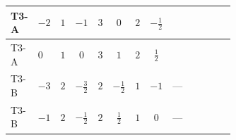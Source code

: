 \documentclass[8pt]{article}
\begin{document}
\begin{landscape}
\begin{longtable}{@{}llcccccc >{\raggedright\arraybackslash}p{0.21\linewidth} >{\raggedright\arraybackslash}p{0.21\linewidth} >{\raggedright\arraybackslash}p{0.21\linewidth}@{}}
T3-A & $-2$ & $1$ & $-1$ & $3$ & $0$ & $2$ & $-\frac{1}{2}$ & \scriptsize\adjustbox{max width=\linewidth}{$\begin{gathered} +\frac{1}{4} (2 \left({y_1}\,\left({y_1}\right)^{\dagger}\,{Y_e}\right)_{ij}+3 \left({y_2}\,\left({y_2}\right)^{\dagger}\,{Y_e}\right)_{ij}+6 \left({Y_e}\,\left({Y_e}\right)^{\dagger}\,{Y_e}\right)_{ij})\end{gathered}$} & \scriptsize\adjustbox{max width=\linewidth}{$\begin{gathered} -\frac{9}{4} {g_2}^2 \left({Y_e}\right)_{ij}\end{gathered}$} & \scriptsize\adjustbox{max width=\linewidth}{$\begin{gathered} -\frac{15}{4} {g_1}^2 \left({Y_e}\right)_{ij}\end{gathered}$} \\
\midrule
T3-A & $0$ & $1$ & $0$ & $3$ & $1$ & $2$ & $\frac{1}{2}$ & \scriptsize\adjustbox{max width=\linewidth}{$\begin{gathered} +\frac{1}{4} (2 \left({y_1}\,\left({y_1}\right)^{\dagger}\,{Y_e}\right)_{ij}+3 \left({y_2}\,\left({y_2}\right)^{\dagger}\,{Y_e}\right)_{ij}+6 \left({Y_e}\,\left({Y_e}\right)^{\dagger}\,{Y_e}\right)_{ij})\end{gathered}$} & \scriptsize\adjustbox{max width=\linewidth}{$\begin{gathered} -\frac{9}{4} {g_2}^2 \left({Y_e}\right)_{ij}\end{gathered}$} & \scriptsize\adjustbox{max width=\linewidth}{$\begin{gathered} -\frac{15}{4} {g_1}^2 \left({Y_e}\right)_{ij}\end{gathered}$} \\
\midrule
T3-B & $-3$ & $2$ & $-\frac{3}{2}$ & $2$ & $-\frac{1}{2}$ & $1$ & $-1$ & --- & \scriptsize\adjustbox{max width=\linewidth}{$\begin{gathered} -\frac{9}{4} {g_2}^2 \left({Y_e}\right)_{ij}\end{gathered}$} & \scriptsize\adjustbox{max width=\linewidth}{$\begin{gathered} -\frac{15}{4} {g_1}^2 \left({Y_e}\right)_{ij}\end{gathered}$} \\
\midrule
T3-B & $-1$ & $2$ & $-\frac{1}{2}$ & $2$ & $\frac{1}{2}$ & $1$ & $0$ & --- & \scriptsize\adjustbox{max width=\linewidth}{$\begin{gathered} -\frac{9}{4} {g_2}^2 \left({Y_e}\right)_{ij}\end{gathered}$} & \scriptsize\adjustbox{max width=\linewidth}{$\begin{gathered} -\frac{15}{4} {g_1}^2 \left({Y_e}\right)_{ij}\end{gathered}$} \\

\end{longtable}
\end{landscape}
\end{document}
